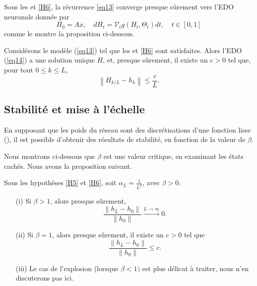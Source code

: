 Sous les  et \ref{H6}, la récurrence \ref{eq13} converge presque sûrement vers l'EDO neuronale donnée par
\begin{equation}\label{eq14}
    H_0=A x, \quad d H_t=\mathscr{V}_t g\left(H_t, \Theta_t\right) d t, \quad t \in[0,1]
\end{equation}
comme le montre la proposition ci-dessous.

\begin{proposition}\label{prop11}
    Considérons le modèle (\ref{eq13}) tel que les  et \ref{H6} sont satisfaites. Alors l'EDO (\ref{eq14}) a une solution unique $H$, et, presque sûrement, il existe un $c > 0$ tel que, pour tout $0 \leqslant k \leqslant L$,
    \[
        \left\|H_{k / L}-h_k\right\| \leqslant \frac{c}{L}
    .\]
\end{proposition}
\subsection{Stabilité et mise à l'échelle}
En supposant que les poids du réseau sont des discrétisations d'une fonction lisse (), il est possible d'obtenir des résultats de stabilité, en fonction de la valeur de $\beta$.

Nous montrons ci-dessous que $\beta$ est une valeur critique, en examinant les états cachés. Nous avons la proposition suivant.

\begin{proposition}\label{prop12}
    Sous les hypothèses \ref{H5} et \ref{H6}, soit $\alpha_L = \frac{1}{L^{\beta}}$, avec $\beta >0 $.
    \begin{itemize}
        \item [(i)] Si $\beta > 1 $, alors presque sûrement, 
            \[
                \frac{\left\| h_L - h_0 \right\| }{\left\| h_0 \right\| } \xrightarrow{L \to \infty } 0 
            .\]
        \item [(ii)] Si $\beta = 1 $, alors presque sûrement, il existe un $c > 0$ tel que
            \[
                \frac{\left\| h_L - h_0 \right\| }{\left\| h_0 \right\| } \leqslant c
            .\]
        \item [(iii)] Le cas de l'explosion (lorsque $ \beta < 1) $ est plus délicat à traiter, nous n'en discuterons pas ici.
    \end{itemize}
\end{proposition}

